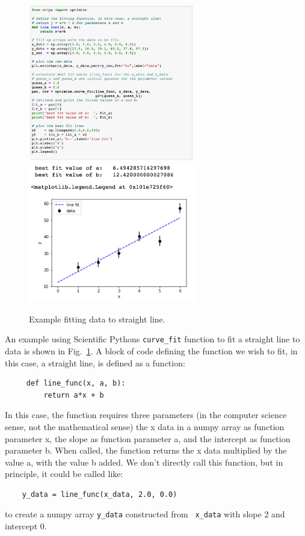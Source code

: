 \begin{figure}[htbp]
\begin{center}
\includegraphics[width=0.65\textwidth]{figs/labs/fitting/fit_code.png} \\
\includegraphics[width=0.65\textwidth]{figs/labs/fitting/fit_out.png} \\
\caption{Example fitting data to straight line.}
\label{fig:fiteg}
\end{center}
\end{figure}

An example using Scientific Pythons {\tt curve{\_}fit} function to fit
a straight line to data is shown in Fig.~\ref{fig:fiteg}.  A block of 
code defining the function we wish to fit, in this case, a straight
line, is defined as a function:
\begin{verbatim}
     def line_func(x, a, b):
         return a*x + b
\end{verbatim}
In this case, the function requires three parameters (in the computer
science sense, not the mathematical sense) the x data in a numpy array
as function parameter x, the slope as function parameter a, and the
intercept as function parameter b.  When called, the function returns
the x data multiplied by the value a, with the value b added.  We
don't directly call this function, but in principle, it could be
called like:
\begin{verbatim}
    y_data = line_func(x_data, 2.0, 0.0)
\end{verbatim}
to create a numpy array {\tt y{\_}data} constructed from {\tt
  x{\_}data} with slope 2 and intercept 0.

